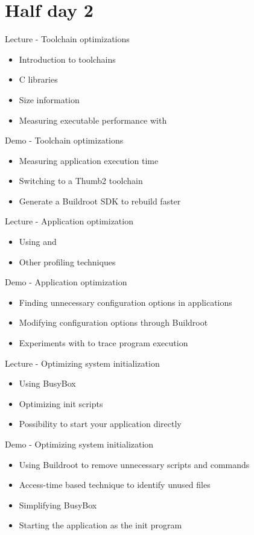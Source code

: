 \documentclass[a4paper,12pt,obeyspaces,spaces,hyphens]{article}
\begin{document}
\section{Half day 2}

\feagendaonecolumn
{Lecture - Toolchain optimizations}
{
  \begin{itemize}
  \item Introduction to toolchains
  \item C libraries
  \item Size information
  \item Measuring executable performance with 
  \end{itemize}
}

\feagendaonecolumn
{Demo - Toolchain optimizations}
{
  \begin{itemize}
  \item Measuring application execution time
  \item Switching to a Thumb2 toolchain
  \item Generate a Buildroot SDK to rebuild faster
  \end{itemize}
}

\feagendatwocolumn
{Lecture - Application optimization}
{
  \begin{itemize}
  \item Using  and 
  \item Other profiling techniques
  \end{itemize}
}
{Demo - Application optimization}
{
 \begin{itemize}
 \item Finding unnecessary configuration options in applications
 \item Modifying configuration options through Buildroot
 \item Experiments with  to trace program execution
 \end{itemize}
}

\feagendatwocolumn
{Lecture - Optimizing system initialization}
{
  \begin{itemize}
  \item Using BusyBox 
  \item Optimizing init scripts
  \item Possibility to start your application directly
  \end{itemize}
}
{Demo - Optimizing system initialization}
{
 \begin{itemize}
 \item Using Buildroot to remove unnecessary scripts and commands
 \item Access-time based technique to identify  unused files
 \item Simplifying BusyBox
 \item Starting the application as the init program
 \end{itemize}
}
\end{document}
